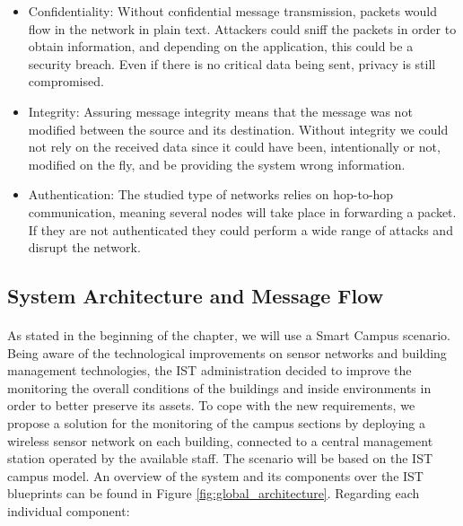 \begin{itemize}
	\item Confidentiality: Without confidential message transmission, packets would flow in the network in plain text. Attackers could sniff the packets in order to obtain information, and depending on the application, this could be a security breach. Even if there is no critical data being sent, privacy is still compromised.\\
	\item Integrity: Assuring message integrity means that the message was not modified between the source and its destination. Without integrity we could not rely on the received data since it could have been, intentionally or not, modified on the fly, and be providing the system wrong information.\\
	\item Authentication: The studied type of networks relies on hop-to-hop communication, meaning several nodes will take place in forwarding a packet. If they are not authenticated they could perform a wide range of attacks and disrupt the network.
\end{itemize}

\subsection{System Architecture and Message Flow}
\paragraph{}

As stated in the beginning of the chapter, we will use a Smart Campus scenario. Being aware of the technological improvements on sensor networks and building management technologies, the \gls{IST} administration decided to improve the monitoring the overall conditions of the buildings and inside environments in order to better preserve its assets. To cope with the new requirements, we propose a solution for the monitoring of the campus sections by deploying a wireless sensor network on each building, connected to a central management station operated by the available staff. The scenario will be based on the \gls{IST} campus model. An overview of the system and its components over the \gls{IST} blueprints can be found in Figure \ref{fig:global_architecture}. Regarding each individual component:

